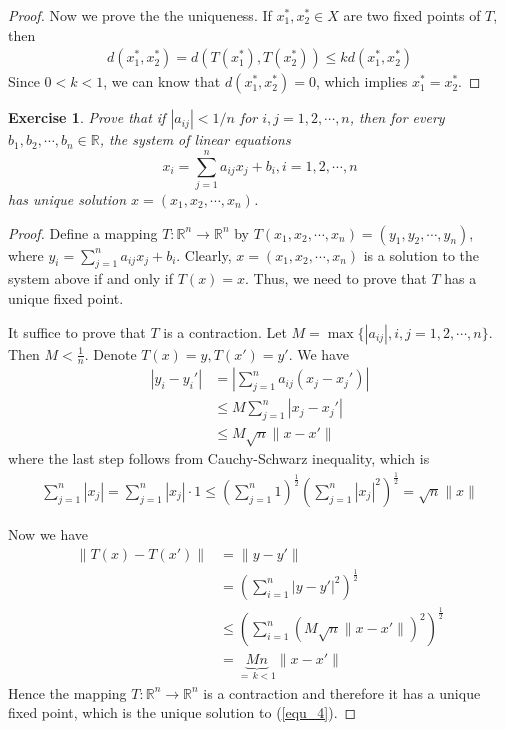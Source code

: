 \documentclass[12pt,leqno]{amsart}
\newtheorem{exercise}{Exercise}[section]
\theoremstyle{definition}
\numberwithin{equation}{subsection}
\begin{document}
\begin{proof}
Now we prove the the uniqueness. If $x_1^*, x_2^*\in X$ are two fixed points of $T$, then 
\begin{align*}
    d\left(x_1^*, x_2^*\right) = d\left(T(x_1^*), T(x_2^*)\right) \leq k d(x_1^*, x_2^*)
\end{align*}
Since $0<k<1$, we can know that $d(x_1^*, x_2^*) = 0$, which implies $x_1^* = x_2^*$.
\end{proof}

\medskip

\begin{exercise}
Prove that if $\left|a_{ij}\right| < 1/n$ for $i,j = 1,2,\cdots, n$, then for every $b_1,b_2,\cdots,b_n\in\mathbb{R}$, the system of linear equations 
\begin{equation}\label{equ_4}
    x_i = \sum^n_{j=1}a_{ij}x_j + b_i, i = 1,2,\cdots,n
\end{equation}
has unique solution $x = (x_1,x_2,\cdots,x_n)$.
\end{exercise}
\begin{proof}
Define a mapping $T:\mathbb{R}^n\to\mathbb{R}^n$ by $T(x_1,x_2,\cdots,x_n) = (y_1,y_2,\cdots,y_n)$, where $y_i = \sum^n_{j=1}a_{ij}x_j + b_i$. Clearly, $x = (x_1,x_2,\cdots,x_n)$ is a solution to the system above if and only if $T(x) = x$. Thus, we need to prove that $T$ has a unique fixed point. 

It suffice to prove that $T$ is a contraction. Let $M = \max\{|a_{ij}|,i,j = 1,2,\cdots,n\}$. Then $M < \frac{1}{n}$. Denote $T(x) = y, T(x') = y'$. We have
\begin{align*}
    \left|y_i - y_i'\right| & = \left|\sum^n_{j=1}a_{ij}(x_j - x_j')\right| \\
    & \leq M \sum^n_{j=1}\left|x_j - x_j'\right| \\
    & \leq M \sqrt{n} \|x - x'\|
\end{align*}
where the last step follows from Cauchy-Schwarz inequality, which is 
\begin{align*}
    \sum^n_{j=1}\left|x_j\right| = \sum^n_{j=1}\left|x_j\right|\cdot 1 \leq \left(\sum^n_{j=1}1\right)^{\frac{1}{2}} \left(\sum^n_{j=1}\left|x_j\right|^2\right)^{\frac{1}{2}} = \sqrt{n} \|x\|
\end{align*}

Now we have 
\begin{align*}
    \|T(x) - T(x')\| & = \|y - y'\| \\
    & = \left(\sum^n_{i=1}|y-y'|^2\right)^{\frac{1}{2}} \\
    & \leq \left(\sum^n_{i=1}(M \sqrt{n} \|x - x'\|)^2\right)^{\frac{1}{2}} \\
    & = \underbrace{Mn}_{ =\, k < 1} \|x - x'\|
\end{align*}
Hence the mapping $T:\mathbb{R}^n\to\mathbb{R}^n$ is a contraction and therefore it has a unique fixed point, which is the unique solution to (\ref{equ_4}).
\end{proof}
\end{document}
